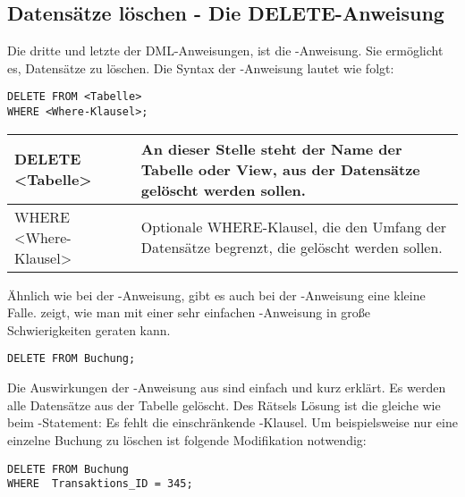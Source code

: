       \subsection{Datensätze löschen - Die DELETE-Anweisung}
        Die dritte und letzte der DML-Anweisungen, ist die \DELETE-Anweisung.
        Sie ermöglicht es, Datensätze zu löschen. Die Syntax der
        \DELETE-Anweisung lautet wie folgt:
        \begin{lstlisting}[language=oracle_sql,caption={Die \DELETE-Anweisung},label=sql07_19]
DELETE FROM <Tabelle>
WHERE <Where-Klausel>;
        \end{lstlisting}
        \begin{center}
          \label{deletesyntax}
          \begin{small}
            \tabletail{
              \hline
            }
            \begin{supertabular}{|l|p{10.8cm}|}
              DELETE <Tabelle> & An dieser Stelle steht der Name der Tabelle
              oder View, aus der Datensätze gelöscht werden sollen. \\
              \hline
              WHERE <Where-Klausel> & Optionale WHERE-Klausel, die den Umfang
              der Datensätze begrenzt, die gelöscht werden sollen. \\
            \end{supertabular}
          \end{small}
        \end{center}
        Ähnlich wie bei der \UPDATE-Anweisung, gibt es auch bei der
        \DELETE-Anweisung eine kleine Falle.  zeigt, wie man
        mit einer sehr einfachen \DELETE-Anweisung in große Schwierigkeiten
        geraten kann.
        \begin{lstlisting}[language=oracle_sql,caption={Eine tödliche \DELETE-Anweisung},label=sql07_20]
DELETE FROM Buchung;
        \end{lstlisting}
        Die Auswirkungen der \DELETE-Anweisung aus  sind
        einfach und kurz erklärt. Es werden alle Datensätze aus der Tabelle
         gelöscht. Des Rätsels Lösung ist die gleiche
        wie beim \UPDATE-Statement: Es fehlt die einschränkende
        \WHERE-Klausel. Um beispielsweise nur eine einzelne Buchung zu löschen
        ist folgende Modifikation notwendig:
        \begin{lstlisting}[language=oracle_sql,caption={Schon viel besser!!!},label=sql07_21]
DELETE FROM Buchung
WHERE  Transaktions_ID = 345;
        \end{lstlisting}
